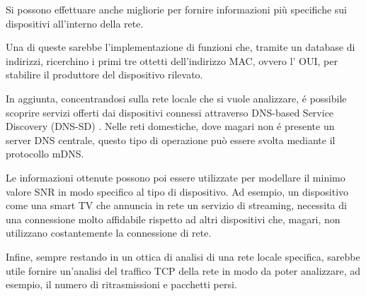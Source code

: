 Si possono effettuare anche migliorie per fornire informazioni pi\`u specifiche sui dispositivi all'interno della rete.

Una di queste sarebbe l'implementazione di funzioni che, tramite un database di indirizzi, ricerchino i primi tre ottetti dell'indirizzo MAC, ovvero l' OUI, per stabilire il produttore del dispositivo rilevato.

In aggiunta, concentrandosi sulla rete locale che si vuole analizzare, \'e possibile scoprire servizi offerti dai dispositivi connessi attraverso DNS-based Service Discovery (DNS-SD) \cite{rfc6763}.
Nelle reti domestiche, dove magari non \'e presente un server DNS centrale, questo tipo di operazione pu\`o essere svolta mediante il protocollo mDNS\cite{rfc6762}.

Le informazioni ottenute possono poi essere utilizzate per modellare il minimo valore SNR in modo specifico al tipo di dispositivo.
Ad esempio, un dispositivo come una smart TV che annuncia in rete un servizio di streaming, necessita di una connessione molto affidabile rispetto ad altri dispositivi che, magari, non utilizzano costantemente la connessione di rete.

Infine, sempre restando in un ottica di analisi di una rete locale specifica, sarebbe utile fornire un'analisi del traffico TCP della rete in modo da poter analizzare, ad esempio, il numero di ritrasmissioni e pacchetti persi.
